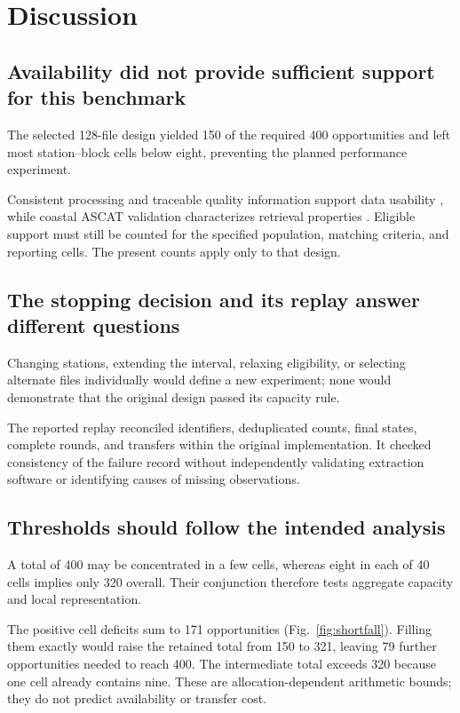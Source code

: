 \section{Discussion}
\label{sec:discussion}

\subsection{Availability did not provide sufficient support for this benchmark}
The selected 128-file design yielded 150 of the required 400 opportunities and left most station--block cells below eight, preventing the planned performance experiment.

Consistent processing and traceable quality information support data usability \cite{dwyer2018,qa4eo2010}, while coastal ASCAT validation characterizes retrieval properties \cite{verhoef2012,lindsley2016,soisuvarn2023}. Eligible support must still be counted for the specified population, matching criteria, and reporting cells. The present counts apply only to that design.

\subsection{The stopping decision and its replay answer different questions}
Changing stations, extending the interval, relaxing eligibility, or selecting alternate files individually would define a new experiment; none would demonstrate that the original design passed its capacity rule.

The reported replay reconciled identifiers, deduplicated counts, final states, complete rounds, and transfers within the original implementation. It checked consistency of the failure record without independently validating extraction software or identifying causes of missing observations.

\subsection{Thresholds should follow the intended analysis}
A total of 400 may be concentrated in a few cells, whereas eight in each of 40 cells implies only 320 overall. Their conjunction therefore tests aggregate capacity and local representation.

The positive cell deficits sum to 171 opportunities (Fig.~\ref{fig:shortfall}). Filling them exactly would raise the retained total from 150 to 321, leaving 79 further opportunities needed to reach 400. The intermediate total exceeds 320 because one cell already contains nine. These are allocation-dependent arithmetic bounds; they do not predict availability or transfer cost.

